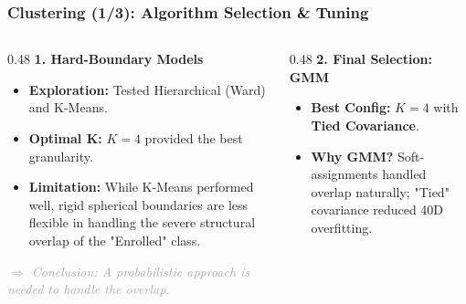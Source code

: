 \documentclass[aspectratio=169]{beamer}
\begin{document}
\begin{frame}
\frametitle{Clustering (1/3): Algorithm Selection \& Tuning}

\begin{columns}[T]

    \begin{column}{0.48\textwidth}
        \vspace{0.2cm}
        {\large \textbf{\textcolor{mainblue}{1. Hard-Boundary Models}}}
        \vspace{0.2cm}
        \begin{itemize}
            \footnotesize
            \setlength{\itemsep}{6pt} 
            \item \textbf{Exploration:} Tested Hierarchical (Ward) and K-Means.
            \item \textbf{Optimal K:} $K=4$ provided the best granularity.
            \item \textbf{Limitation:} While K-Means performed well, rigid spherical boundaries are less flexible in handling the severe structural overlap of the "Enrolled" class.
        \end{itemize}
        
        \vspace{0.6cm}
        \textit{\textcolor{darkgray}{$\Rightarrow$ Conclusion: A probabilistic approach is needed to handle the overlap.}}
    \end{column}

    \begin{column}{0.48\textwidth}
        \vspace{0.2cm}
        {\large \textbf{\textcolor{mainblue}{2. Final Selection: GMM}}}
        \vspace{0.2cm}
        \begin{itemize}
            \footnotesize
            \setlength{\itemsep}{6pt}
            \item \textbf{Best Config:} $K=4$ with \textbf{Tied Covariance}. 
            \item \textbf{Why GMM?} Soft-assignments handled overlap naturally; "Tied" covariance reduced 40D overfitting.
        \end{itemize}
        
        \vspace{0.4cm}
        

\end{column}
\end{columns}
\end{frame}
\end{document}
